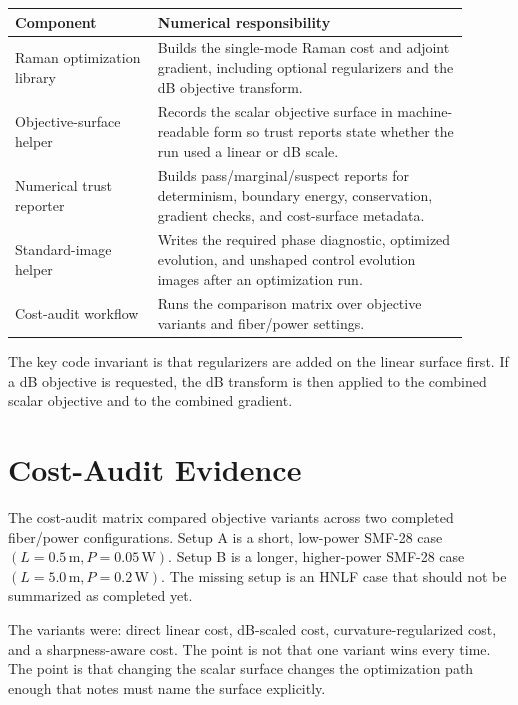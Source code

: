\documentclass[11pt]{article}
\begin{document}
\begin{center}
\footnotesize
\begin{tabular}{>{\raggedright\arraybackslash}p{0.29\linewidth}
                >{\raggedright\arraybackslash}p{0.61\linewidth}}
\toprule
\textbf{Component} & \textbf{Numerical responsibility} \\
\midrule
Raman optimization library &
Builds the single-mode Raman cost and adjoint gradient, including optional
regularizers and the dB objective transform. \\
Objective-surface helper &
Records the scalar objective surface in machine-readable form so trust reports
state whether the run used a linear or dB scale. \\
Numerical trust reporter &
Builds pass/marginal/suspect reports for determinism, boundary energy,
conservation, gradient checks, and cost-surface metadata. \\
Standard-image helper &
Writes the required phase diagnostic, optimized evolution, and unshaped
control evolution images after an optimization run. \\
Cost-audit workflow &
Runs the comparison matrix over objective variants and fiber/power settings. \\
\bottomrule
\end{tabular}
\end{center}

The key code invariant is that regularizers are added on the linear surface
first. If a dB objective is requested, the dB transform is then applied to the
combined scalar objective and to the combined gradient.

\section{Cost-Audit Evidence}

The cost-audit matrix compared objective variants across two completed
fiber/power configurations. Setup A is a short, low-power SMF-28 case
\((L=0.5\,\mathrm{m}, P=0.05\,\mathrm{W})\). Setup B is a longer, higher-power
SMF-28 case \((L=5.0\,\mathrm{m}, P=0.2\,\mathrm{W})\). The missing setup is an
HNLF case that should not be summarized as completed yet.

The variants were: direct linear cost, dB-scaled cost, curvature-regularized
cost, and a sharpness-aware cost. The point is not that one variant wins every
time. The point is that changing the scalar surface changes the optimization
path enough that notes must name the surface explicitly.
\end{document}
